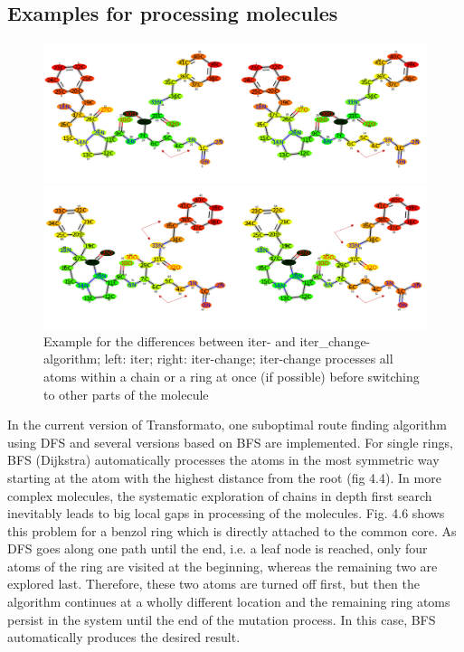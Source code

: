 \subsection{Examples for processing molecules}

\begin{figure}
\includegraphics[scale=0.4]{iter_iter_change_1a5g_1}

\includegraphics[scale=0.4]{iter_iter_change_1a5g_2}\caption{Example for the differences between iter- and iter\_change-algorithm;
left: iter; right: iter-change; iter-change processes all atoms within
a chain or a ring at once (if possible) before switching to other
parts of the molecule}
\end{figure}

In the current version of Transformato, one suboptimal route finding algorithm using DFS and several versions based on BFS are implemented.
For single rings, BFS (Dijkstra) automatically processes the atoms in the most symmetric way starting at the atom with the highest distance from the root (fig 4.4).
In more complex molecules, the systematic exploration of chains in
depth first search inevitably leads to big local gaps in processing
of the molecules. Fig. 4.6 shows this problem for a benzol ring which
is directly attached to the common core. As DFS goes along one path
until the end, i.e. a leaf node is reached, only four atoms of the
ring are visited at the beginning, whereas the remaining two are explored
last. Therefore, these two atoms are turned off first, but then the
algorithm continues at a wholly different location and the remaining
ring atoms persist in the system until the end of the mutation process.
In this case, BFS automatically produces the desired result. 

